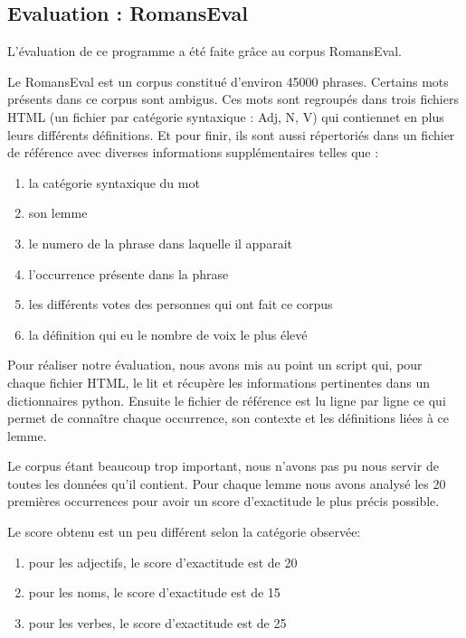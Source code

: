 \subsection{Evaluation : RomansEval}

L'évaluation de ce programme a été faite grâce au corpus RomansEval.

Le RomansEval est un corpus constitué d'environ 45000 phrases. Certains mots 
présents dans ce corpus sont ambigus. Ces mots sont regroupés dans trois 
fichiers HTML (un fichier par catégorie syntaxique : Adj, N, V) qui contiennet 
en plus leurs différents définitions. Et pour finir, ils sont aussi répertoriés 
dans un fichier de référence avec diverses informations supplémentaires telles 
que :

\begin{enumerate}
 \item la catégorie syntaxique du mot
 \item son lemme
 \item le numero de la phrase dans laquelle il apparait
 \item l'occurrence présente dans la phrase
 \item les différents votes des personnes qui ont fait ce corpus
 \item la définition qui eu le nombre de voix le plus élevé
 \end{enumerate}

Pour réaliser notre évaluation, nous avons mis au point un script qui, pour 
chaque fichier HTML, le lit et récupère les informations pertinentes dans un 
dictionnaires python. Ensuite le fichier de référence est lu ligne par ligne 
ce qui permet de connaître chaque occurrence, son contexte et les définitions 
liées à ce lemme.

Le corpus étant beaucoup trop important, nous n'avons pas pu nous servir de 
toutes les données qu'il contient. Pour chaque lemme nous avons analysé les 20 
premières occurrences pour avoir un score d'exactitude le plus précis possible.

Le score obtenu est un peu différent selon la catégorie observée:

\begin{enumerate}
 \item pour les adjectifs, le score d'exactitude est de 20%
 \item pour les noms, le score d'exactitude est de 15%
 \item pour les verbes, le score d'exactitude est de 25%
\end{enumerate}

